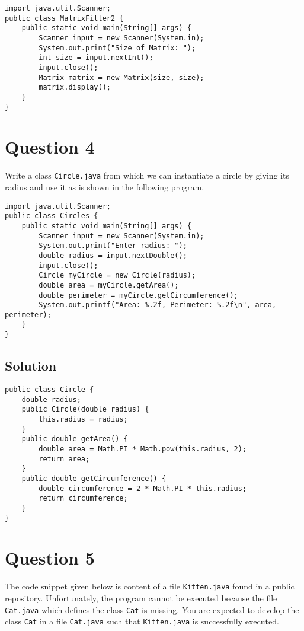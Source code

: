 \documentclass[12pt,letterpaper,twoside]{article}
\begin{document}
\newpage

\lstset{language=Java,tabsize=4}
\begin{lstlisting}
import java.util.Scanner;
public class MatrixFiller2 {
	public static void main(String[] args) {
		Scanner input = new Scanner(System.in);
		System.out.print("Size of Matrix: ");
		int size = input.nextInt();
		input.close();
		Matrix matrix = new Matrix(size, size);
		matrix.display();
	}
}
\end{lstlisting}

\section*{Question 4}

Write a class \texttt{Circle.java} from which we can instantiate a circle by giving its radius and use it as is shown in the following program.

\lstset{caption=}
\lstset{language=Java,tabsize=4}
\begin{lstlisting}
import java.util.Scanner;
public class Circles {
	public static void main(String[] args) {
		Scanner input = new Scanner(System.in);
		System.out.print("Enter radius: ");
		double radius = input.nextDouble();
		input.close();
		Circle myCircle = new Circle(radius);
		double area = myCircle.getArea();
		double perimeter = myCircle.getCircumference();
		System.out.printf("Area: %.2f, Perimeter: %.2f\n", area, perimeter);
	}
}
\end{lstlisting}

\subsection*{Solution}

\lstset{language=Java,tabsize=4}
\begin{lstlisting}
public class Circle {
	double radius;
	public Circle(double radius) {
		this.radius = radius;
	}
	public double getArea() {
		double area = Math.PI * Math.pow(this.radius, 2);
		return area;
	}
	public double getCircumference() {
		double circumference = 2 * Math.PI * this.radius;
		return circumference;
	}
}
\end{lstlisting}

\section*{Question 5}

The code snippet given below is content of a file \texttt{Kitten.java} found in a public repository.
Unfortunately, the program cannot be executed because the file \texttt{Cat.java} which defines the class \texttt{Cat} is missing.
You are expected to develop the class \texttt{Cat} in a file \texttt{Cat.java} such that \texttt{Kitten.java} is successfully executed.
\end{document}
